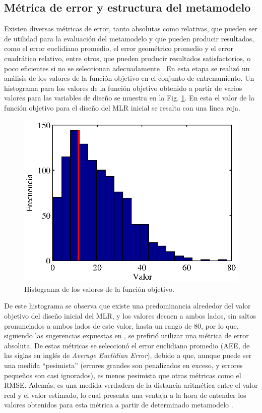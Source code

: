 \subsection{Métrica de error y estructura del metamodelo}
Existen diversas métricas de error, tanto absolutas como relativas, que pueden ser de utilidad para la evaluación del metamodelo y que pueden producir resultados, como el error euclidiano promedio, el error geométrico promedio y el error cuadrático relativo, entre otros, que pueden producir resultados satisfactorios, o poco eficientes si no se seleccionan adecuadamente \cite{gorissen2010}.
En esta etapa se realizó un análisis de los valores de la función objetivo en el conjunto de entrenamiento. Un histograma para los valores de la función objetivo obtenido a partir de varios valores para las variables de diseño se muestra en la Fig. \ref{fig:fobjhist}. En esta el valor de la función objetivo para el diseño del MLR inicial se resalta con una línea roja.
\begin{figure}[t]
\centering
\includegraphics[scale=0.9]{../img/Construccion_de_un_Metamodelo/fobjhist.eps}
\caption{Histograma de los valores de la función objetivo.}
\label{fig:fobjhist}
\end{figure}
De este histograma se observa que existe una predominancia alrededor del valor objetivo del diseño inicial del MLR, y los valores decaen a ambos lados, sin saltos pronunciados a ambos lados de este valor, hasta un rango de 80, por lo que, siguiendo las sugerencias expuestas en \cite{gorissen2010}, se prefirió utilizar una métrica de error absoluta. De estas métricas se seleccionó el error euclidiano promedio (AEE, de las siglas en inglés de \textit{Average Euclidian Error}), debido a que, aunque puede ser una medida ``pesimista'' (errores grandes son penalizados en exceso, y errores pequeños son casi ignorados), es menos pesimista que otras métricas como el RMSE. Además, es una medida verdadera de la distancia aritmética entre el valor real y el valor estimado, lo cual presenta una ventaja a la hora de entender los valores obtenidos para esta métrica a partir de determinado metamodelo \cite{rong2006}.

